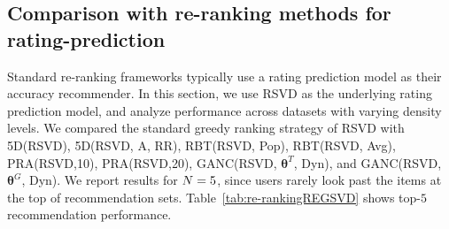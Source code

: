 \subsection{Comparison with re-ranking methods for rating-prediction}
\label{sec:re-rankingratingprediction}
Standard re-ranking frameworks typically use a rating prediction model as their  accuracy recommender. In this section, we use RSVD as the underlying rating prediction model, and analyze performance across datasets with varying density levels.   We  compared the standard greedy ranking strategy of RSVD with 
 5D(RSVD), 5D(RSVD, A, RR),
 RBT(RSVD, Pop), RBT(RSVD, Avg),  PRA(RSVD,10),  PRA(RSVD,20), GANC(RSVD, $\bm{\theta}^T$, Dyn), and  GANC(RSVD, $\bm{\theta}^G$, Dyn). We report results for $N=5$, since users rarely look past the items at the top of  recommendation sets.  Table~\ref{tab:re-rankingREGSVD} shows top-$5$ recommendation performance.  

